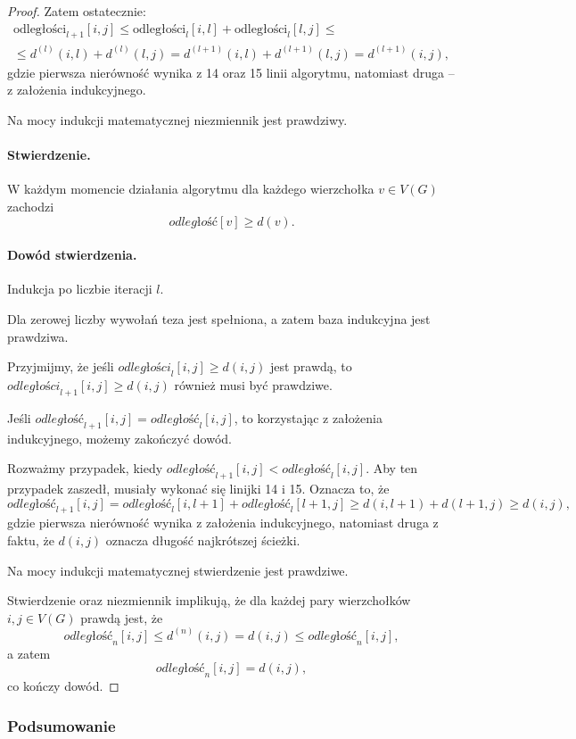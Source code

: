 \begin{theorem}
\begin{proof}
		Zatem ostatecznie:
		\begin{gather*}
		\text{odległości}_{l+1}[i,j] \leq 
		\text{odległości}_{l}[i,l] + \text{odległości}_{l}[l,j] \leq
		\\
		\leq d^{(l)}(i, l) + d^{(l)}(l, j) = d^{(l+1)}(i, l) + d^{(l+1)}(l, j) = d^{(l+1)}(i, j),
		\end{gather*}
		gdzie pierwsza nierówność wynika z 14 oraz 15 linii algorytmu,
		natomiast druga -- z założenia indukcyjnego.
		
		Na mocy indukcji matematycznej niezmiennik jest prawdziwy.
		
		\paragraph{Stwierdzenie. } W każdym momencie działania algorytmu
		dla każdego wierzchołka $v \in V(G)$ zachodzi 
		\[\textit{odległość}[v] \geq d(v).\]
		
		\paragraph{Dowód stwierdzenia.} Indukcja po liczbie iteracji $l$.
		
		Dla zerowej liczby wywołań teza jest spełniona, a 
		zatem baza indukcyjna jest prawdziwa.
		
		Przyjmijmy, że jeśli $\textit{odległości}_l[i, j] \geq d(i, j)$
		jest prawdą, to $\textit{odległości}_{l+1}[i, j] \geq d(i, j)$
		również musi być prawdziwe.
		
		Jeśli $\textit{odległość}_{l+1}[i, j] = \textit{odległość}_{l}[i, j]$,
		to korzystając z założenia indukcyjnego, możemy zakończyć dowód.
		
		Rozważmy przypadek, kiedy 
		$\textit{odległość}_{l+1}[i, j] < \textit{odległość}_{l}[i, j]$. 
		Aby ten przypadek zaszedł, musiały wykonać się linijki 14 i 15.
		Oznacza to, że 
		\[\textit{odległość}_{l+1}[i, j] = \textit{odległość}_{l}[i, l+1] 
		+ \textit{odległość}_{l}[l+1, j] \geq d(i, l+1) + d(l+1, j)
		\geq d(i, j),\]
		gdzie pierwsza nierówność wynika z założenia indukcyjnego,
		natomiast druga z faktu, że $d(i, j)$ oznacza
		długość najkrótszej ścieżki.
		
		Na mocy indukcji matematycznej stwierdzenie jest prawdziwe.
		
		Stwierdzenie oraz niezmiennik implikują, że 
		dla każdej pary wierzchołków
		$i, j \in V(G)$ prawdą jest, że 
		\[\textit{odległość}_n[i,j] \leq d^{(n)}(i, j) = d(i, j) \leq \textit{odległość}_n[i,j],\]
		a zatem
		\[\textit{odległość}_n[i,j] = d(i, j),\]
		co kończy dowód. \qedhere
	\end{proof} 
	\label{floydWarshall_proof}
\end{theorem}

\subsubsection{Podsumowanie}